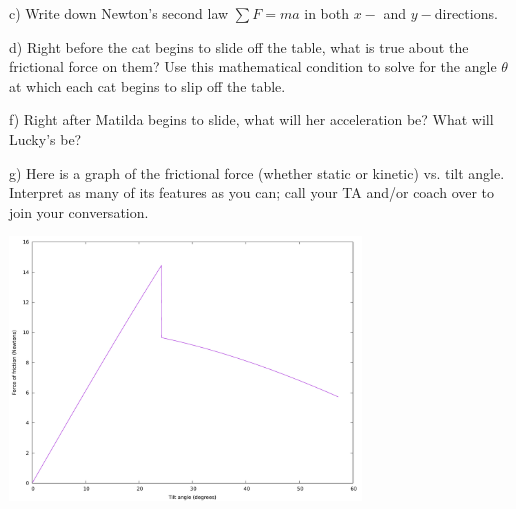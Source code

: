 \documentclass[12pt]{article}
\begin{document}
\vfill

\newpage

c) Write down Newton's second law $\sum F = ma$ in both $x-$ and $y-$directions. 

\vspace{2in}

d) Right before the cat begins to slide off the table, what is true about the frictional force on them? Use this 
mathematical condition to solve for the angle $\theta$ at which each cat begins to slip off the table.

\vspace{2in}

f) Right after Matilda begins to slide, what will her acceleration be? What will Lucky's be?

\vspace{3in}
\newpage

g) Here is a graph of the frictional force (whether static or kinetic) vs. tilt angle. Interpret as many of its features as you
can; call your TA and/or coach over to join your conversation.

\begin{center}
\includegraphics[width=0.7\textwidth]{tilt.pdf}	
	
\end{center}
\end{document}
